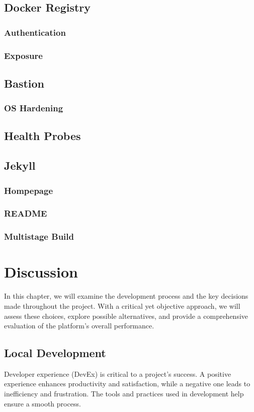 \section{Docker Registry}

\subsection{Authentication}
\subsection{Exposure}

\section{Bastion}
\subsection{OS Hardening}

\section{Health Probes}

\section{Jekyll}
\subsection{Hompepage}
\subsection{README}
\subsection{Multistage Build}

\chapter{Discussion}
In this chapter, we will examine the development process and the key decisions made throughout the project. With a critical yet objective approach, we will assess these choices, explore possible alternatives, and provide a comprehensive evaluation of the platform's overall performance.

\section{Local Development}
Developer experience (DevEx) is critical to a project's success. A positive experience enhances productivity and satisfaction, while a negative one leads to inefficiency and frustration. The tools and practices used in development help ensure a smooth process.

